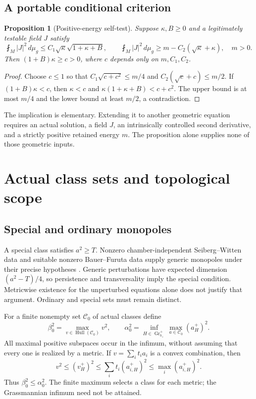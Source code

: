 \documentclass[11pt,a4paper]{article}
\newtheorem{proposition}[theorem]{Proposition}
\theoremstyle{definition}
\theoremstyle{remark}
\DeclareMathOperator{\Hull}{Hull}
\DeclareMathOperator{\Gr}{Gr}
\newcommand{\dd}{\,d\mu_g}
\newcommand{\avg}[1]{\fint_M #1\dd}
\numberwithin{equation}{section}
\begin{document}
\subsection{A portable conditional criterion}\label{sub:portable-criterion}
\begin{proposition}[Positive-energy self-test]\label{prop:self-test}
Suppose $\kappa,B\ge0$ and a legitimately testable field $J$ satisfy
\[
 \avg{|J|^2}\le C_1\sqrt\kappa\sqrt{1+\kappa+B},\qquad
 \avg{|J|^2}\ge m-C_2(\sqrt\kappa+\kappa),\quad m>0.
\]
Then $(1+B)\kappa\ge c>0$, where $c$ depends only on $m,C_1,C_2$.
\end{proposition}
\begin{proof}
Choose $c\le1$ so that
$C_1\sqrt{c+c^2}\le m/4$ and $C_2(\sqrt c+c)\le m/2$.
If $(1+B)\kappa<c$, then $\kappa<c$ and
$\kappa(1+\kappa+B)<c+c^2$. The upper bound is at most $m/4$
and the lower bound at least $m/2$, a contradiction.
\end{proof}
The implication is elementary. Extending it to another geometric
equation requires an actual solution, a field $J$, an intrinsically
controlled second derivative, and a strictly positive retained energy
$m$. The proposition alone supplies none of those geometric inputs.

\section{Actual class sets and topological scope}\label{sec:classes}
\subsection{Special and ordinary monopoles}\label{sub:special}
A special class satisfies $a^2\ge T$. Nonzero chamber-independent
Seiberg--Witten data and suitable nonzero Bauer--Furuta data supply
generic monopoles under their precise hypotheses
\cite{Kotschick,Ishida,IL}. Generic perturbations have expected dimension
$(a^2-T)/4$, so persistence and transversality imply the special condition.
Metricwise existence for the unperturbed equations alone does not
justify that argument. Ordinary and special sets must remain distinct.

For a finite nonempty set $\mathscr C_0$ of actual classes define
\begin{equation}\label{eq:capacities}
 \beta_0^2=\max_{v\in\Hull(\mathscr C_0)}v^2,\qquad
 \alpha_0^2=\inf_{H\in\Gr^+_{b_+}}
                       \max_{a\in\mathscr C_0}(a_H^+)^2.
\end{equation}
All maximal positive subspaces occur in the infimum, without assuming
that every one is realized by a metric. If $v=\sum_i t_i a_i$ is a
convex combination, then
\[
 v^2\le(v_H^+)^2\le\sum_i t_i(a_{i,H}^+)^2
                                     \le\max_i(a_{i,H}^+)^2.
\]
Thus $\beta_0^2\le\alpha_0^2$. The finite maximum selects a class
for each metric; the Grassmannian infimum need not be attained.
\end{document}
